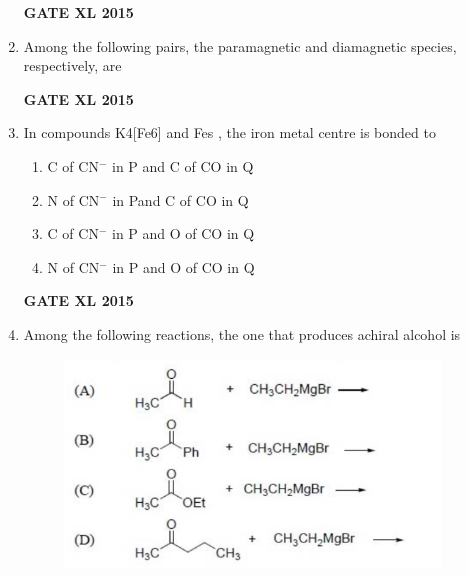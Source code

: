 \documentclass[journal,12pt,onecolumn]{IEEEtran}
\begin{document}
\begin{enumerate}
    \begin{enumerate}
    \end{enumerate}
\begin{flushright}\textbf{GATE XL 2015}\end{flushright}
\item Among the following pairs, the paramagnetic and diamagnetic species, respectively, are
    \begin{enumerate}
    \end{enumerate}
\begin{flushright}\textbf{GATE XL 2015}\end{flushright}
\item In compounds K4[Fe6]  and Fes , the iron metal centre is bonded to
    \begin{enumerate}
            \item C of CN$^-$ in P and C of CO in Q
            \item N of CN$^-$ in Pand C of CO in Q
            \item C of CN$^-$ in P and O of CO in Q
            \item N of CN$^-$ in P and O of CO in Q
    \end{enumerate}
\begin{flushright}\textbf{GATE XL 2015}\end{flushright}
\item  Among the following reactions, the one that produces achiral alcohol  is\\
	\begin{figure}[h!]
    \includegraphics[width=10cm]{21}

\end{figure}
\end{enumerate}
\end{document}
